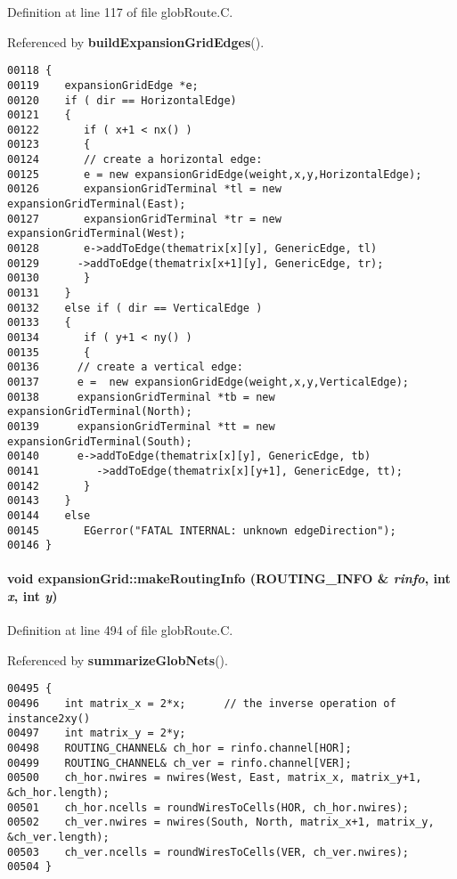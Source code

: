 Definition at line 117 of file glob\-Route.C.

Referenced by {\bf build\-Expansion\-Grid\-Edges}().\small\begin{verbatim}00118 {
00119    expansionGridEdge *e;
00120    if ( dir == HorizontalEdge)
00121    {
00122       if ( x+1 < nx() )
00123       {
00124       // create a horizontal edge:
00125       e = new expansionGridEdge(weight,x,y,HorizontalEdge);
00126       expansionGridTerminal *tl = new expansionGridTerminal(East);
00127       expansionGridTerminal *tr = new expansionGridTerminal(West);
00128       e->addToEdge(thematrix[x][y], GenericEdge, tl)
00129      ->addToEdge(thematrix[x+1][y], GenericEdge, tr);
00130       }
00131    }
00132    else if ( dir == VerticalEdge )
00133    {
00134       if ( y+1 < ny() )
00135       {
00136      // create a vertical edge:
00137      e =  new expansionGridEdge(weight,x,y,VerticalEdge);
00138      expansionGridTerminal *tb = new expansionGridTerminal(North);
00139      expansionGridTerminal *tt = new expansionGridTerminal(South);
00140      e->addToEdge(thematrix[x][y], GenericEdge, tb)
00141         ->addToEdge(thematrix[x][y+1], GenericEdge, tt);
00142       }
00143    }
00144    else
00145       EGerror("FATAL INTERNAL: unknown edgeDirection");
00146 }
\end{verbatim}\normalsize 
\label{expansionGrid_c5}
\paragraph{\setlength{\rightskip}{0pt plus 5cm}void expansion\-Grid::make\-Routing\-Info ({\bf ROUTING\_\-INFO} \& {\em rinfo}, int {\em x}, int {\em y})\hspace{0.3cm}{\tt  [private]}}\hfill



Definition at line 494 of file glob\-Route.C.

Referenced by {\bf summarize\-Glob\-Nets}().\small\begin{verbatim}00495 {
00496    int matrix_x = 2*x;      // the inverse operation of instance2xy()
00497    int matrix_y = 2*y;
00498    ROUTING_CHANNEL& ch_hor = rinfo.channel[HOR];
00499    ROUTING_CHANNEL& ch_ver = rinfo.channel[VER];
00500    ch_hor.nwires = nwires(West, East, matrix_x, matrix_y+1, &ch_hor.length);
00501    ch_hor.ncells = roundWiresToCells(HOR, ch_hor.nwires);
00502    ch_ver.nwires = nwires(South, North, matrix_x+1, matrix_y, &ch_ver.length);
00503    ch_ver.ncells = roundWiresToCells(VER, ch_ver.nwires);
00504 }
\end{verbatim}\normalsize 
\label{expansionGrid_a7}
